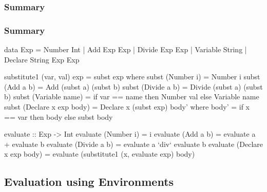 \documentclass{beamer}
\begin{document}
\subsubsection{Summary}
\begin{frame}[fragile]
\frametitle{Summary}

\begin{teenycode}
data Exp = Number     Int
         | Add        Exp Exp
         | Divide     Exp Exp
         | Variable   String
         | Declare    String Exp Exp

substitute1 (var, val) exp = subst exp where
  subst (Number i)      = Number i
  subst (Add a b)       = Add (subst a) (subst b)
  subst (Divide a b)    = Divide (subst a) (subst b)
  subst (Variable name) = if var == name
                          then Number val
                          else Variable name
  subst (Declare x exp body)  = Declare x (subst exp) body'
    where body' = if x == var
                  then body
                  else subst body

evaluate :: Exp -> Int
evaluate (Number i)       = i
evaluate (Add a b)        = evaluate a + evaluate b
evaluate (Divide a b)     = evaluate a `div` evaluate b
evaluate (Declare x exp body) = evaluate (substitute1 (x, evaluate exp) body)
\end{teenycode}

\end{frame}

\subsection{Evaluation using Environments}
\end{document}

